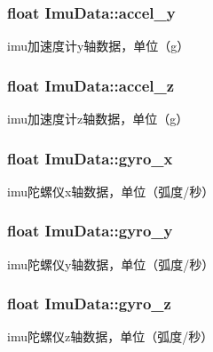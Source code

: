 \subsubsection[{\texorpdfstring{accel\+\_\+y}{accel_y}}]{\setlength{\rightskip}{0pt plus 5cm}float Imu\+Data\+::accel\+\_\+y}\hypertarget{structImuData_abfc7185440169b8ef2571f9df60741b5}{}\label{structImuData_abfc7185440169b8ef2571f9df60741b5}
imu加速度计y轴数据，单位（g） 
\subsubsection[{\texorpdfstring{accel\+\_\+z}{accel_z}}]{\setlength{\rightskip}{0pt plus 5cm}float Imu\+Data\+::accel\+\_\+z}\hypertarget{structImuData_a0c86f254f9f528e174e9ea7779eb2e99}{}\label{structImuData_a0c86f254f9f528e174e9ea7779eb2e99}
imu加速度计z轴数据，单位（g） 
\subsubsection[{\texorpdfstring{gyro\+\_\+x}{gyro_x}}]{\setlength{\rightskip}{0pt plus 5cm}float Imu\+Data\+::gyro\+\_\+x}\hypertarget{structImuData_a7693a5307463d99e37530abc5f3ec8ec}{}\label{structImuData_a7693a5307463d99e37530abc5f3ec8ec}
imu陀螺仪x轴数据，单位（弧度/秒） 
\subsubsection[{\texorpdfstring{gyro\+\_\+y}{gyro_y}}]{\setlength{\rightskip}{0pt plus 5cm}float Imu\+Data\+::gyro\+\_\+y}\hypertarget{structImuData_a9cb9ff8ceb19f95af9a2c1144d167067}{}\label{structImuData_a9cb9ff8ceb19f95af9a2c1144d167067}
imu陀螺仪y轴数据，单位（弧度/秒） 
\subsubsection[{\texorpdfstring{gyro\+\_\+z}{gyro_z}}]{\setlength{\rightskip}{0pt plus 5cm}float Imu\+Data\+::gyro\+\_\+z}\hypertarget{structImuData_a1f5297d4e01240a47f0c4a8338a9df5f}{}\label{structImuData_a1f5297d4e01240a47f0c4a8338a9df5f}
imu陀螺仪z轴数据，单位（弧度/秒） 
